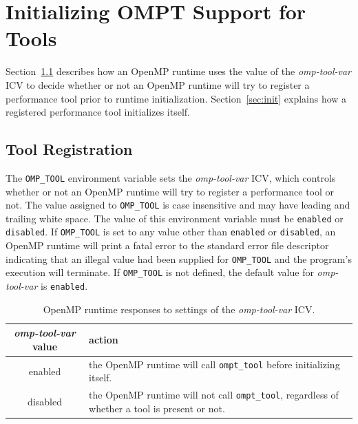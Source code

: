 \documentclass{article}
\begin{document}
\section{Initializing OMPT Support for Tools}
\label{sec:enabling}

Section~\ref{sec:env} describes how an OpenMP runtime uses the value of the {\em omp-tool-var} ICV to decide whether or not an OpenMP runtime will try to register a performance tool prior to runtime initialization.
Section~\ref{sec:init} explains how a registered performance tool initializes itself.

\subsection{Tool Registration}
\label{sec:env}

The  \verb|OMP_TOOL| environment variable sets the {\em omp-tool-var} ICV, which controls whether or not an OpenMP 
runtime will try to register a performance tool or not. The value assigned to \verb|OMP_TOOL| is 
case insensitive and may have leading and trailing white space.  The value of
this environment variable must be \verb|enabled| or \verb|disabled|.   If  \verb|OMP_TOOL| is set to any value other than \verb|enabled| or \verb|disabled|, an OpenMP runtime will print a fatal error  to the standard error file descriptor indicating that an illegal value had been supplied for \verb|OMP_TOOL| and the program's execution will terminate. If \verb|OMP_TOOL| is not defined, the default value for  {\em omp-tool-var}  is  \verb|enabled|.

 \begin{table}
\begin{center}
\begin{tabular}{|c|p{4.5in}|}
\hline
 {\em omp-tool-var} value & action \\\hline
enabled & the OpenMP runtime will call  \verb|ompt_tool| before initializing itself.   \\\hline
disabled & the OpenMP runtime will not call  \verb|ompt_tool|, regardless of whether a tool is present or not.  \\\hline
\end{tabular}
\end{center}
\caption{OpenMP runtime responses to settings of the {\em omp-tool-var} ICV.}
\label{table:env-var}
\end{table}
\end{document}
